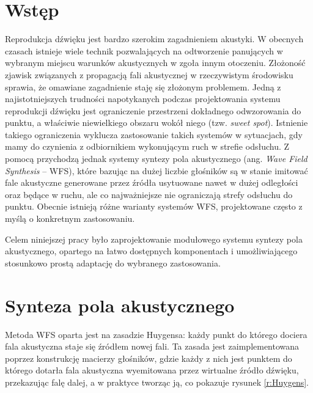 \documentclass[12pt]{oska}
\affiliation{Akademia Górniczo-Hutnicza im. Stanisława Staszica w Krakowie}
\let\Oldsection\section
\renewcommand{\section}{\FloatBarrier\Oldsection}
\begin{document}
\maketitles

\section{Wstęp}

Reprodukcja dźwięku jest bardzo szerokim zagadnieniem akustyki. W obecnych
czasach istnieje wiele technik pozwalających na odtworzenie panujących w
wybranym miejscu warunków akustycznych w zgoła innym otoczeniu. Złożoność
zjawisk związanych z propagacją fali akustycznej w rzeczywistym środowisku
sprawia, że omawiane zagadnienie staję się złożonym problemem. Jedną z
najistotniejszych trudności napotykanych podczas projektowania systemu
reprodukcji dźwięku jest ograniczenie przestrzeni dokładnego odwzorowania do
punktu, a właściwie niewielkiego obszaru wokół niego (tzw. \textit{sweet spot}).
Istnienie takiego ograniczenia wyklucza zastosowanie takich systemów w
sytuacjach, gdy mamy do czynienia z odbiornikiem wykonującym ruch w strefie
odsłuchu. Z pomocą przychodzą jednak systemy syntezy pola akustycznego (ang. \textit{Wave
Field Synthesis} -- WFS), które bazując na dużej liczbie głośników są w stanie
imitować fale akustyczne generowane przez źródła usytuowane nawet w dużej
odległości oraz będące w ruchu, ale co najważniejsze nie ograniczają strefy
odsłuchu do punktu. Obecnie istnieją różne warianty systemów WFS, projektowane
często z myślą o konkretnym zastosowaniu. 

Celem niniejszej pracy
było zaprojektowanie modułowego systemu syntezy pola akustycznego, opartego na
łatwo dostępnych komponentach i umożliwiającego stosunkowo prostą adaptację do
wybranego zastosowania.

\section{Synteza pola akustycznego}

Metoda WFS oparta jest na zasadzie Huygensa: każdy punkt
do którego dociera fala akustyczna staje się źródłem nowej fali. Ta zasada
jest zaimplementowana poprzez konstrukcję macierzy głośników, gdzie każdy z nich
jest punktem do którego dotarła fala akustyczna wyemitowana przez wirtualne
źródło dźwięku, przekazując falę dalej, a w praktyce tworząc ją, co pokazuje rysunek
\ref{r:Huygens}.
\end{document}
